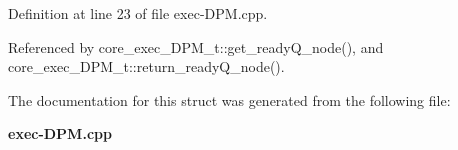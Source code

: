 Definition at line 23 of file exec-DPM.cpp.

Referenced by core\_\-exec\_\-DPM\_\-t::get\_\-readyQ\_\-node(), and core\_\-exec\_\-DPM\_\-t::return\_\-readyQ\_\-node().

The documentation for this struct was generated from the following file:\begin{CompactItemize}
\item 
{\bf exec-DPM.cpp}\end{CompactItemize}
